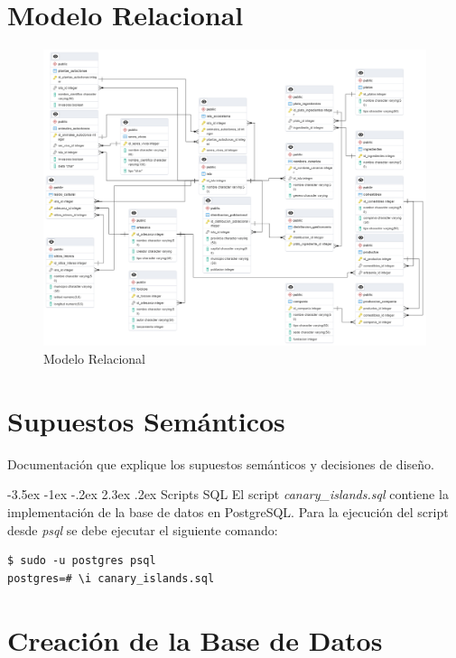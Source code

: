 \documentclass[11pt]{report}
\makeatletter
\renewcommand\chapter{\@startsection{chapter}{0}{\z@}%
    {-3.5ex \@plus -1ex \@minus -.2ex}%
    {2.3ex \@plus.2ex}%
    {\normalfont\Large\bfseries}}
\makeatother
\begin{document}
\section{Modelo Relacional}
\begin{figure}[H]
      \centering
      \includegraphics[width=1\textwidth]{../diagrams/RELACIONAL.png}
      \caption{Modelo Relacional}
      \label{fig:modelo_relacional}
\end{figure}

\section{Supuestos Semánticos}
Documentación que explique los supuestos semánticos y decisiones de diseño.

\chapter{Scripts SQL}
El script \emph{canary\_islands.sql} contiene la implementación de la base de datos en PostgreSQL. Para la ejecución
del script desde \emph{psql} se debe ejecutar el siguiente comando:
\begin{verbatim}
$ sudo -u postgres psql
postgres=# \i canary_islands.sql
\end{verbatim}

\newpage

\section{Creación de la Base de Datos}
\lstset{style=mystyle}

\end{document}
